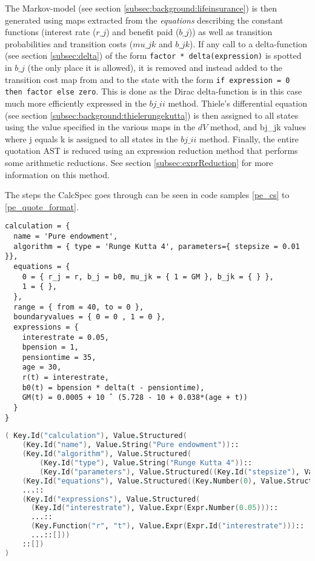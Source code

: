 The Markov-model (see section \ref{subsec:background:lifeinsurance}) is then generated using maps extracted from the \emph{equations} describing the constant functions (interest rate ($r\_j$) and benefit paid ($b\_j$)) as well as transition probabilities and transition costs ($mu\_jk$ and $b\_jk$).
If any call to a delta-function (see section \ref{subsec:delta}) of the form \lstinline$factor * delta(expression)$ is spotted in $b\_j$ (the only place it is allowed), it is removed and instead added to the transition cost map from and to the state with the form \lstinline$if expression = 0 then factor else zero$.
This is done as the Dirac delta-function is in this case much more efficiently expressed in the $bj\_ii$ method.
Thiele's differential equation (see section \ref{subsec:background:thielerungekutta}) is then assigned to all states using the value specified in the various maps in the $dV$ method, and bj\_jk values where j equals k is assigned to all states in the $bj\_ii$ method.
Finally, the entire quotation AST is reduced using an expression reduction method that performs some arithmetic reductions.
See section \ref{subsec:exprReduction} for more information on this method.

The steps the CalcSpec goes through can be seen in code samples \ref{pe_cs} to \ref{pe_quote_format}.
\clearpage
\begin{lstlisting}[language=calcspec, caption=Pure endowment in CalcSpec, label=pe_cs]
calculation = {
  name = 'Pure endowment',
  algorithm = { type = 'Runge Kutta 4', parameters={ stepsize = 0.01 }},
  equations = {
    0 = { r_j = r, b_j = b0, mu_jk = { 1 = GM }, b_jk = { } },
    1 = { },
  },
  range = { from = 40, to = 0 },
  boundaryvalues = { 0 = 0 , 1 = 0 },
  expressions = {
    interestrate = 0.05,
    bpension = 1,
    pensiontime = 35,
    age = 30,
    r(t) = interestrate,
    b0(t) = bpension * delta(t - pensiontime),
    GM(t) = 0.0005 + 10 ˆ (5.728 - 10 + 0.038*(age + t))
  }
}
\end{lstlisting}

\begin{lstlisting}[language=fsharp, caption=Abstract Syntax Tree for the Pure endowment CalcSpec, label=pe_ast]
( Key.Id("calculation"), Value.Structured(
    (Key.Id("name"), Value.String("Pure endowment"))::
    (Key.Id("algorithm"), Value.Structured(
        (Key.Id("type"), Value.String("Runge Kutta 4"))::
        (Key.Id("parameters"), Value.Structured((Key.Id("stepsize"), Value.Expr(Expr.Number(0.01)))::[])))::[])::
    (Key.Id("equations"), Value.Structured((Key.Number(0), Value.Structured(...:[]))::[]))::
    ...::
    (Key.Id("expressions"), Value.Structured(
      (Key.Id("interestrate"), Value.Expr(Expr.Number(0.05)))::
      ...::
      (Key.Function("r", "t"), Value.Expr(Expr.Id("interestrate")))::
      ...::[]))
    ::[])
)
\end{lstlisting}

